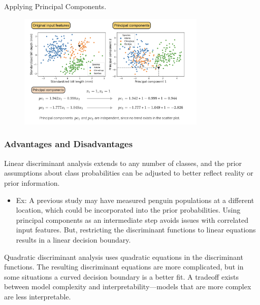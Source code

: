 \documentclass[10pt,dvipsnames]{beamer}
\begin{document}
\begin{frame}{Applying Principal Components.}
	\begin{figure}[ht]
		\centering
		\includegraphics[width=0.8\textwidth]{imgs/df_16.png}
	\end{figure}
\end{frame}

\begin{frame}
	\frametitle{Advantages and Disadvantages}
	Linear discriminant analysis extends to any number of classes, and the prior assumptions about class probabilities can be adjusted to better reflect reality or prior information.
	\begin{itemize}
		\item Ex: A previous study may have measured penguin populations at a different location, which could be incorporated into the prior probabilities. Using principal components as an intermediate step avoids issues with correlated input features. But, restricting the discriminant functions to linear equations results in a linear decision boundary.
	\end{itemize}

	Quadratic discriminant analysis uses quadratic equations in the discriminant functions. The resulting discriminant equations are more complicated, but in some situations a curved decision boundary is a better fit. A tradeoff exists between model complexity and interpretability—models that are more complex are less interpretable.
\end{frame}
\end{document}

